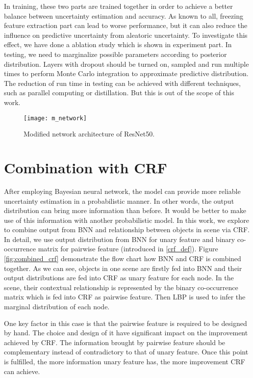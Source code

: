 In training, these two parts are trained together in order to achieve a better balance between uncertainty estimation and accuracy. As known to all, freezing feature extraction part can lead to worse performance, but it can also reduce the influence on predictive uncertainty from aleatoric uncertainty. To investigate this effect, we have done a ablation study which is shown in experiment part. In testing, we need to marginalize possible parameters according to posterior distribution. Layers with dropout should be turned on, sampled and run multiple times to perform Monte Carlo integration to approximate predictive distribution. The reduction of run time in testing can be achieved with different techniques, such as parallel computing or distillation. But this is out of the scope of this work.
\begin{figure}[H]
	\begin{center}
		\texttt{[image: m\_network]}
		\caption{Modified network architecture of ResNet50.}		
		\label{fig:modified_net}
	\end{center}
\end{figure}

\section{Combination with CRF}
After employing Bayesian neural network, the model can provide more reliable uncertainty estimation in a probabilistic manner. In other words, the output distribution can bring more information than before. It would be better to make use of this information with another probabilistic model. In this work, we explore to combine output from BNN and relationship between objects in scene via CRF. In detail, we use output distribution from BNN for unary feature and binary co-occurrence matrix for pairwise feature (introduced in \ref{crf_def}). Figure \ref{fig:combined_crf} demonstrate the flow chart how BNN and CRF is combined together. As we can see, objects in one scene are firstly fed into BNN and their output distributions are fed into CRF as unary feature for each node. In the scene, their contextual relationship is represented by the binary co-occurrence matrix which is fed into CRF as pairwise feature. Then LBP is used to infer the marginal distribution of each node. 

One key factor in this case is that the pairwise feature is required to be designed by hand. The choice and design of it have significant impact on the improvement achieved by CRF. The information brought by pairwise feature should be complementary instead of contradictory to that of unary feature. Once this point is fulfilled, the more information unary feature has, the more improvement CRF can achieve.

